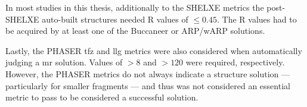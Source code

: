 In most studies in this thesis, additionally to the SHELXE metrics the post-SHELXE auto-built structures needed R values of $\leq0.45$. The R values had to be acquired by at least one of the Buccaneer \cite{Cowtan2006-xv} or ARP/wARP \cite{Cohen2007-wg} solutions.

Lastly, the PHASER \gls{tfz} and \gls{llg} metrics were also considered when automatically judging a \gls{mr} solution. Values of $>8$ and $>120$ were required, respectively. However, the PHASER metrics do not always indicate a structure solution --- particularly for smaller fragments --- and thus was not considered an essential metric to pass to be considered a successful solution.
